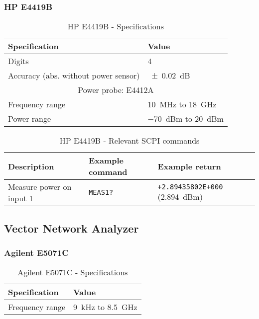 \subsubsection{HP E4419B}\label{app:hpe4419}
\begin{table}[H]
	\centering
	\caption{HP E4419B - Specifications}
	\label{tab:hp-E4419B-specs}
	\begin{tabularx}{\textwidth}{ll}
		\toprule
		\textbf{Specification} & \textbf{Value}\\
		\midrule
		Digits & 4\\
		Accuracy (abs. without power sensor) & \SI{+-0.02}{\dB} \\
		\multicolumn{2}{c}{Power probe: E4412A}\\
		Frequency range & \SI{10}{\MHz} to \SI{18}{\GHz}\\
		Power range & \SI{-70}{dBm} to \SI{20}{dBm}\\
		\bottomrule
	\end{tabularx}
\end{table}

\begin{table}[H]
	\centering
	\caption{HP E4419B - Relevant SCPI commands}
	\label{tab:hp-E4419B-scpi}
	\begin{tabularx}{\textwidth}{Xll}
		\toprule
		\textbf{Description} & \textbf{Example command} & \textbf{Example return}\\
		\midrule
		Measure power on input 1 & \texttt{MEAS1?} & \texttt{+2.89435802E+000} (\SI{2.894}{dBm}) \\
		\bottomrule
	\end{tabularx}
\end{table}

\subsection{Vector Network Analyzer}
\subsubsection{Agilent E5071C}\label{app:agilent-e5071c}
\begin{table}[H]
	\centering
	\caption{Agilent E5071C - Specifications}
	\label{tab:agilent-E5071C-specs}
	\begin{tabularx}{\textwidth}{ll}
		\toprule
		\textbf{Specification} & \textbf{Value}\\
		\midrule
		Frequency range & \SI{9}{\kHz} to \SI{8.5}{\GHz}
	\end{tabularx}
\end{table}

